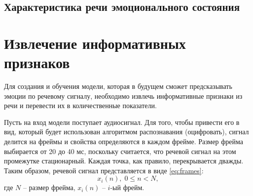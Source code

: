 \subsection{Характеристика речи эмоционального состояния}
	
\section{Извлечение информативных признаков}
Для создания и обучения модели, которая в будущем сможет предсказывать эмоции по речевому сигналу, необходимо извлечь информативные признаки из речи и перевести их в количественные показатели. 

Пусть на вход модели поступает аудиосигнал. Для того, чтобы привести его в вид, который будет использован алгоритмом распознавания (оцифровать), сигнал делится на фреймы и свойства определяются в каждом фрейме. Размер фрейма выбирается от 20 до 40 мс, поскольку считается, что речевой сигнал на этом промежутке стационарный. Каждая точка, как правило, перекрывается дважды. \cite{mfcc-steps} Таким образом, речевой сигнал представляется в виде \ref{eq:frames}:
\begin{equation}\label{eq:frames}
	x_i(n),\;0 \leq n < N,
\end{equation}
где $N$ – размер фрейма, $x_i(n)$ -- $i$-ый фрейм. \\


%
%




